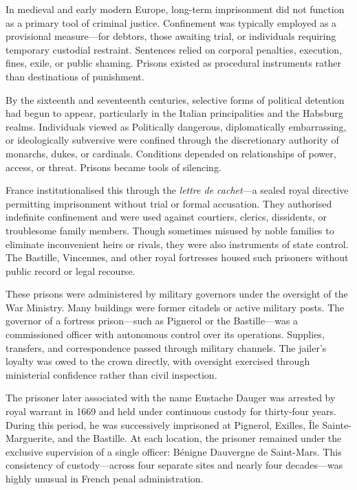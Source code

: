 In medieval and early modern Europe, long-term imprisonment did not function as a primary tool of criminal justice. Confinement was typically employed as a provisional measure—for debtors, those awaiting trial, or individuals requiring temporary custodial restraint. Sentences relied on corporal penalties, execution, fines, exile, or public shaming. Prisons existed as procedural instruments rather than destinations of punishment.

By the sixteenth and seventeenth centuries, selective forms of political detention had begun to appear, particularly in the Italian principalities and the Habsburg realms. Individuals viewed as Politically dangerous, diplomatically embarrassing, or ideologically subversive were confined through the discretionary authority of monarchs, dukes, or cardinals. Conditions depended on relationships of power, access, or threat. Prisons became tools of silencing.

France institutionalised this through the \textit{lettre de cachet}—a sealed royal directive permitting imprisonment without trial or formal accusation. They authorised indefinite confinement and were used against courtiers, clerics, dissidents, or troublesome family members. Though sometimes misused by noble families to eliminate inconvenient heirs or rivals, they were also instruments of state control. The Bastille, Vincennes, and other royal fortresses housed such prisoners without public record or legal recourse.

These prisons were administered by military governors under the oversight of the War Ministry. Many buildings were former citadels or active military posts. The governor of a fortress prison—such as Pignerol or the Bastille—was a commissioned officer with autonomous control over its operations. Supplies, transfers, and correspondence passed through military channels. The jailer's loyalty was owed to the crown directly, with oversight exercised through ministerial confidence rather than civil inspection.

The prisoner later associated with the name Eustache Dauger was arrested by royal warrant in 1669 and held under continuous custody for thirty-four years. During this period, he was successively imprisoned at Pignerol, Exilles, Île Sainte-Marguerite, and the Bastille. At each location, the prisoner remained under the exclusive supervision of a single officer: Bénigne Dauvergne de Saint-Mars. This consistency of custody—across four separate sites and nearly four decades—was highly unusual in French penal administration.

